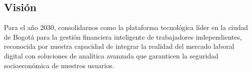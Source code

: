 {}
\subsection*{Visión}

Para el año 2030, consolidarnos como la plataforma tecnológica líder en la ciudad de Bogotá para la gestión financiera inteligente de trabajadores independientes, reconocida por nuestra capacidad de integrar la realidad del mercado laboral digital con soluciones de analítica avanzada que garanticen la seguridad socioeconómica de nuestros usuarios.
